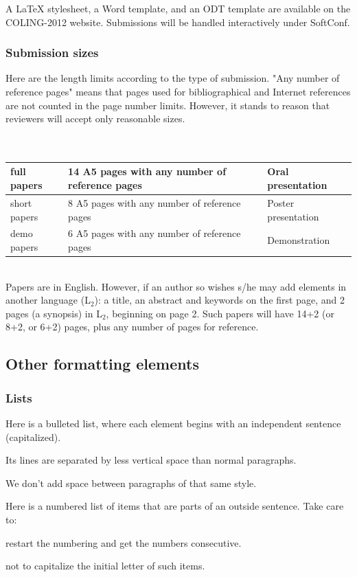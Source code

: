 \documentclass[10pt,a5paper,twoside]{article}
\begin{document}
A LaTeX stylesheet, a Word template, and an ODT template are available on the COLING-2012 website. Submissions will be handled interactively under SoftConf. 
\subsubsection{Submission sizes}
Here are the length limits according to the type of submission. "Any number of reference pages" means that pages used for bibliographical and Internet references are not counted in the page number limits. However, it stands to reason that reviewers will accept only reasonable sizes.\\\\\\
\begin{tabular}{|l|l|l|}
\hline
full papers & 14 A5 pages with any number of reference pages & Oral presentation\\
\hline
short papers & 8 A5 pages with any number of reference pages & Poster presentation\\
\hline
demo papers & 6 A5 pages with any number of reference pages & Demonstration\\
\hline
\end{tabular}\\

Papers are in English. However, if an author so wishes s/he may add elements in another language (L$_{2}$): a title, an abstract and keywords on the first page, and 2 pages (a synopsis) in L$_{2}$, beginning on page 2. Such papers will have 14+2 (or 8+2, or 6+2) pages, plus any number of pages for reference. 
\subsection{Other formatting elements}
\subsubsection{Lists}
Here is a bulleted list, where each element begins with an independent sentence (capitalized).
\begin{compactitem}
\item Its lines are separated by less vertical space than normal paragraphs.
\item We don’t add space between paragraphs of that same style.
\end{compactitem}

Here is a numbered list of items that are parts of an outside sentence. Take care to:
\begin{compactenum}
\item restart the numbering and get the numbers consecutive. 
\item not to capitalize the initial letter of such items.
\end{compactenum}
\end{document}
